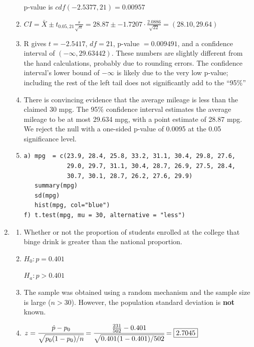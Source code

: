 \documentclass[12pt,letterpaper]{article}
\begin{document}
\begin{enumerate}
\begin{enumerate}
        p-value is $cdf(-2.5377, 21) = \boxed{0.00957}$

      \item $CI = \bar{X} \pm t_{0.05,21}\frac{s}{\sqrt{n}} = 28.87 \pm -1.7207 \cdot \frac{2.0886}{\sqrt{22}} = \boxed{(28.10, 29.64)}$

      \item R gives $t = -2.5417$, $df = 21$, p-value $= 0.009491$, and
        a confidence interval of $(-\infty, 29.63442)$. These numbers are
        slightly different from the hand calculations, probably due to rounding
        errors. The confidence interval's lower bound of $-\infty$ is likely
        due to the very low p-value; including the rest of the left tail does
        not significantly add to the ``95\%''

      \item There is convincing evidence that the average mileage is less than
        the claimed 30 mpg. The 95\% confidence interval estimates the average
        mileage to be at most 29.634 mpg, with a point estimate of 28.87 mpg.
        We reject the null with a one-sided p-value of 0.0095 at the 0.05
        significance level.

      \item
        \begin{verbatim}
a) mpg  = c(23.9, 28.4, 25.8, 33.2, 31.1, 30.4, 29.8, 27.6,
            29.0, 29.7, 31.1, 30.4, 28.7, 26.9, 27.5, 28.4,
            30.7, 30.1, 28.7, 26.2, 27.6, 29.9)
   summary(mpg)
   sd(mpg)
   hist(mpg, col="blue")
f) t.test(mpg, mu = 30, alternative = "less")
        \end{verbatim}
    \end{enumerate}

  \item
    \begin{enumerate}
      \item Whether or not the proportion of students enrolled at the college
        that binge drink is greater than the national proportion.

      \item $H_0: p = 0.401$

        $H_a: p > 0.401$

      \item The sample was obtained using a random mechanism and the sample
        size is large ($n>30$). However, the population standard deviation is
        {\bf not} known.

      \item $z = \cfrac{\hat{p} - p_0}{\sqrt{p_0(1-p_0)/n}} = \cfrac{\frac{231}{502} - 0.401}{\sqrt{0.401(1-0.401)/502}} = \boxed{2.7045}$


\end{enumerate}
\end{enumerate}
\end{document}
